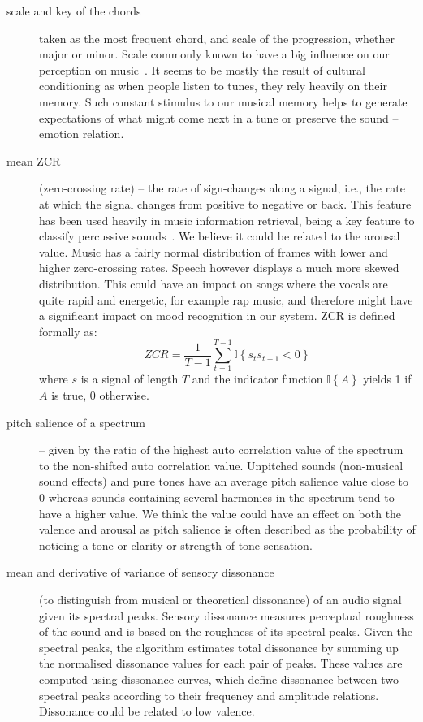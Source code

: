 \begin{description}
\item[scale and key of the chords] taken as the most frequent chord, and scale of the progression, whether major or minor. Scale commonly known to have a big influence on our perception on music~\cite{keys}. It seems to be mostly the result of cultural conditioning as when people listen to tunes, they rely heavily on their memory. Such constant stimulus to our musical memory helps to generate expectations of what might come next in a tune or preserve the sound -- emotion relation.

\item[mean ZCR] (zero-crossing rate) -- the rate of sign-changes along a signal, i.e., the rate at which the signal changes from positive to negative or back. This feature has been used heavily in music information retrieval, being a key feature to classify percussive sounds~\cite{percussive}. We believe it could be related to the arousal value. Music has a fairly normal distribution of frames with lower and higher zero-crossing rates. Speech however displays a much more skewed distribution. This could have an impact on songs where the vocals are quite rapid and energetic, for example rap music, and therefore might have a significant impact on mood recognition in our system.
ZCR is defined formally as: 
\begin{equation}
ZCR = \frac{1}{T-1} \sum_{t=1}^{T-1} {{\mathbb I}\left\{{s_t s_{t-1} < 0}\right\}}
\end{equation}
where $s$ is a signal of length $T$ and the indicator function  ${{\mathbb I}\left\{{A}\right\}}$  yields 1 if $A$ is true, 0 otherwise.

\item[pitch salience of a spectrum] -- given by the ratio of the highest auto correlation value of the spectrum to the non-shifted auto correlation value.  Unpitched sounds (non-musical sound effects) and pure tones have an average pitch salience value close to 0 whereas sounds containing several harmonics in the spectrum tend to have a higher value. We think the value could have an effect on both the valence and arousal as pitch salience is often described as the probability of noticing a tone or clarity or strength of tone sensation.

\item[mean and derivative of variance of sensory dissonance] (to distinguish from musical or theoretical dissonance) of an audio signal given its spectral peaks. Sensory dissonance measures perceptual roughness of the sound and is based on the roughness of its spectral peaks. Given the spectral peaks, the algorithm estimates total dissonance by summing up the normalised dissonance values for each pair of peaks. These values are computed using dissonance curves, which define dissonance between two spectral peaks according to their frequency and amplitude relations. Dissonance could be related to low valence.

\end{description}

